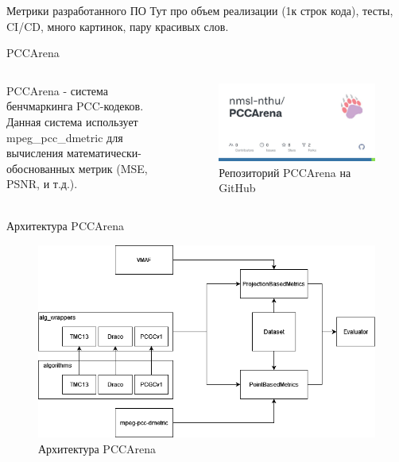 \documentclass[aspectratio=169]{beamer}
\begin{document}
  \begin{frame}{Метрики разработанного ПО}
  Тут про объем реализации (1к строк кода), тесты, CI/CD, много картинок, пару
  красивых слов.
  \end{frame}

  \begin{frame}{PCCArena}
    \begin{columns}
        PCCArena - система бенчмаркинга PCC-кодеков. Данная система использует
        mpeg\_pcc\_dmetric для вычисления математически-обоснованных метрик
        (MSE, PSNR, и т.д.).
        \begin{figure}
          \centering
          \includegraphics[width=\linewidth]{assets/pcc_arena_github.jpg}
          \caption{Репозиторий PCCArena на GitHub}
        \end{figure}
     \end{columns}

  \end{frame}

  \begin{frame}{Архитектура PCCArena}
    \begin{figure}[H]
        \centering
        \includegraphics[width=0.7\linewidth]{assets/pcc_arena_architecture.png}
        \caption{Архитектура PCCArena}
        \label{img:pcc_arena_architecture}
    \end{figure}
  \end{frame}
\end{document}
